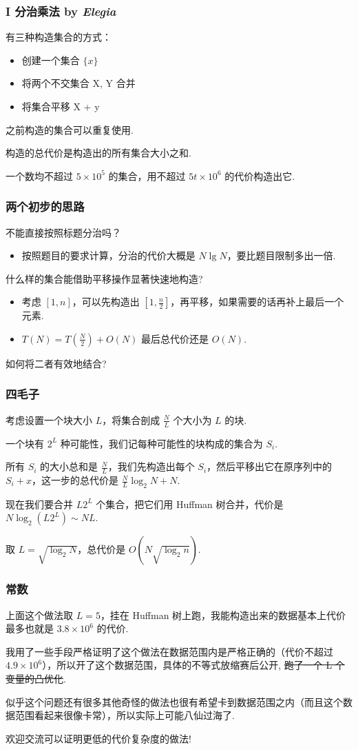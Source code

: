 \frame
{
    \frametitle{I 分治乘法 {by \itshape Elegia}}



    有三种构造集合的方式：

  \begin{itemize}
  \item 创建一个集合 $\{x\}$
  \item 将两个不交集合 X, Y 合并
  \item 将集合平移 X + y
  \end{itemize}

  之前构造的集合可以重复使用.

  构造的总代价是构造出的所有集合大小之和.

  一个数均不超过 $5 \times 10^5$ 的集合，用不超过 $5 t\times 10^6$ 的代价构造出它.

}

\frame
{
    \frametitle{两个初步的思路}

    不能直接按照标题分治吗？ \pause
    \begin{itemize}
    \item 按照题目的要求计算，分治的代价大概是 $N \lg N$，要比题目限制多出一倍. \pause
    \end{itemize}
    什么样的集合能借助平移操作显著快速地构造? \pause

    \begin{itemize}
    \item 考虑 $[1, n]$，可以先构造出 $\left[1, \frac{n}{2}\right]$，再平移，如果需要的话再补上最后一个元素.
    \item $T(N) = T\left(\frac{N}{2}\right) + O(N)$ 最后总代价还是 $O(N)$. \pause
    \end{itemize}
    如何将二者有效地结合?

}

\frame
{
    \frametitle{四毛子}

    考虑设置一个块大小 $L$，将集合剖成 $\frac{N}{L}$ 个大小为 $L$ 的块.

    一个块有 $2^L$ 种可能性，我们记每种可能性的块构成的集合为 $S_i$. \pause

    所有 $S_i$ 的大小总和是 $\frac{N}{L}$，我们先构造出每个 $S_i$，然后平移出它在原序列中的 $S_i+x$，这一步的总代价是 $\frac{N}{L}\log_2 N + N$. \pause

    现在我们要合并 $L2^L$ 个集合，把它们用 Huffman 树合并，代价是 $N \log_2 (L2^L) \sim NL$. \pause

    取 $L=\sqrt{\log_2 N}$，总代价是 $O(N\sqrt{\log_2 n})$.
}

\frame
{
	\frametitle{常数}

	上面这个做法取 $L=5$，挂在 Huffman 树上跑，我能构造出来的数据基本上代价最多也就是 $3.8 \times 10^6$ 的代价.

	我用了一些手段严格证明了这个做法在数据范围内是严格正确的（代价不超过 $4.9 \times 10^6$），所以开了这个数据范围，具体的不等式放缩赛后公开, \sout{跑了一个 L 个变量的凸优化}. \pause

	似乎这个问题还有很多其他奇怪的做法也很有希望卡到数据范围之内（而且这个数据范围看起来很像卡常），所以实际上可能八仙过海了.

	欢迎交流可以证明更低的代价复杂度的做法!


}